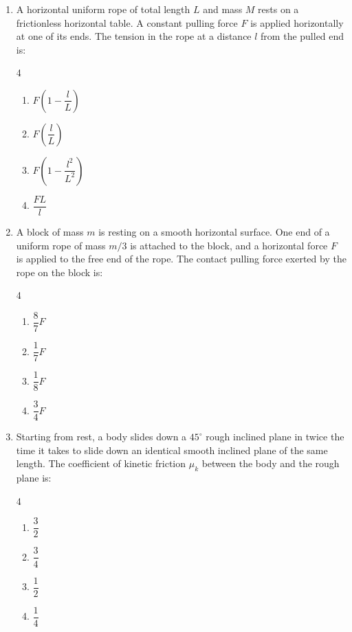 \documentclass[11pt,a4paper]{article}
\begin{document}
\begin{enumerate}[label=\textbf{\arabic*.},leftmargin=18pt,itemsep=8pt,resume]
  \item A horizontal uniform rope of total length $L$ and mass $M$ rests on a frictionless horizontal table. A constant pulling force $F$ is applied horizontally at one of its ends. The tension in the rope at a distance $l$ from the pulled end is:
  \begin{multicols}{4}
    \begin{enumerate}[label=(\Alph*)]
      \item $F\left(1 - \dfrac{l}{L}\right)$
      \item $F\left(\dfrac{l}{L}\right)$
      \item $F\left(1 - \dfrac{l^2}{L^2}\right)$
      \item $\dfrac{F L}{l}$
    \end{enumerate}
  \end{multicols}

  \item A block of mass $m$ is resting on a smooth horizontal surface. One end of a uniform rope of mass $m/3$ is attached to the block, and a horizontal force $F$ is applied to the free end of the rope. The contact pulling force exerted by the rope on the block is:
  \begin{multicols}{4}
    \begin{enumerate}[label=(\Alph*)]
      \item $\dfrac{8}{7}F$
      \item $\dfrac{1}{7}F$
      \item $\dfrac{1}{8}F$
      \item $\dfrac{3}{4}F$
    \end{enumerate}
  \end{multicols}

  \item Starting from rest, a body slides down a $45^\circ$ rough inclined plane in twice the time it takes to slide down an identical smooth inclined plane of the same length. The coefficient of kinetic friction $\mu_k$ between the body and the rough plane is:
  \begin{multicols}{4}
    \begin{enumerate}[label=(\Alph*)]
      \item $\dfrac{3}{2}$
      \item $\dfrac{3}{4}$
      \item $\dfrac{1}{2}$
      \item $\dfrac{1}{4}$
    \end{enumerate}
  \end{multicols}


\end{enumerate}
\end{document}
